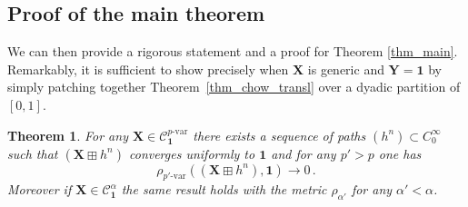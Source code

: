 \documentclass[12pt,a4paper]{article}
\numberwithin{equation}{section}
\theoremstyle{plain}
\newtheorem{theorem}{Theorem}[section]
\theoremstyle{definition}
\theoremstyle{remark}
\begin{document}
\subsection{Proof of the main theorem}
We can then provide a rigorous statement and a proof for Theorem \ref{thm_main}. Remarkably, it is sufficient to show precisely when $\mathbf{X}$ is generic and $\mathbf{Y}=\mathbf 1$ by simply patching together Theorem~\ref{thm_chow_transl} over a dyadic partition  of $[0,1]$.

\begin{theorem}\label{thm_main_rigorous}
	 For any \( \mathbf{X} \in \mathcal{C}^{p\text{-var}}_{\mathbf{1}} \)  there exists  a sequence of paths $(h^n)\subset  C^{\infty}_0$ such that $(\mathbf X\boxplus h^n)$ converges uniformly to $\mathbf{1}$ and for any $p'>p$ one has
	 \begin{equation}\label{eq:weak_conv}
\rho_{p'\text{-var}}((\mathbf X\boxplus h^n),\mathbf 1)\to 0 \,.
	\end{equation}
	Moreover if $\mathbf{X} \in \mathcal{C}^{\alpha}_{\mathbf{1}}$ the same result holds with the metric $\rho_{\alpha'} $ for any $\alpha'<\alpha$.
\end{theorem}
\end{document}
